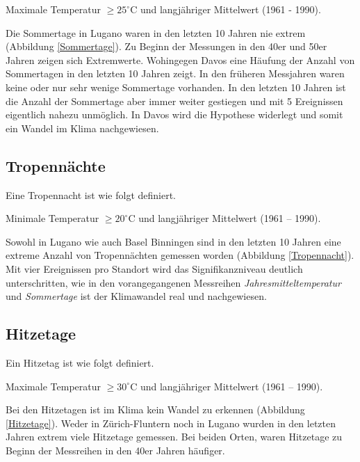 \begin{refsection}
\begin{definition}
Maximale Temperatur $\ge 25^{\circ}$C und langjähriger Mittelwert (1961 - 1990).
\end{definition}

Die Sommertage in Lugano waren in den letzten 10 Jahren nie extrem (Abbildung \ref{Sommertage}). Zu Beginn der Messungen in den 40er und 50er Jahren zeigen sich Extremwerte. Wohingegen Davos eine Häufung der Anzahl von Sommertagen in den letzten 10 Jahren zeigt. In den früheren Messjahren waren keine oder nur sehr wenige Sommertage vorhanden. In den letzten 10 Jahren ist die Anzahl der Sommertage aber immer weiter gestiegen und mit 5 Ereignissen eigentlich nahezu unmöglich. In Davos wird die Hypothese widerlegt und somit ein Wandel im Klima nachgewiesen.


\subsection{Tropennächte}
Eine Tropennacht ist wie folgt definiert.

\begin{definition}
Minimale Temperatur $\ge 20^{\circ}$C und langjähriger Mittelwert (1961 -- 1990).
\end{definition}

Sowohl in Lugano wie auch Basel Binningen sind in den letzten 10 Jahren eine extreme Anzahl von Tropennächten gemessen worden (Abbildung \ref{Tropennacht}). Mit vier Ereignissen pro Standort wird das Signifikanzniveau deutlich unterschritten, wie in den vorangegangenen Messreihen \textit{Jahresmitteltemperatur} und \textit{Sommertage} ist der Klimawandel real und nachgewiesen.


\subsection{Hitzetage}

Ein Hitzetag ist wie folgt definiert.

\begin{definition}
Maximale Temperatur $\ge 30^{\circ}$C und langjähriger Mittelwert (1961 -- 1990).
\end{definition}

Bei den Hitzetagen ist im Klima kein Wandel zu erkennen (Abbildung \ref{Hitzetage}). Weder in Zürich-Fluntern noch in Lugano wurden in den letzten Jahren extrem viele Hitzetage gemessen. Bei beiden Orten, waren Hitzetage zu Beginn der Messreihen in den 40er Jahren häufiger.



\end{refsection}
